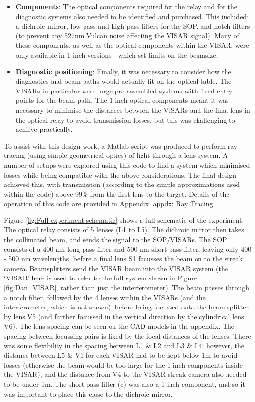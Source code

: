 \begin{itemize}
    \item\textbf{Components}: The optical components required for the relay and for the diagnostic systems also needed to be identified and purchased. This included: a dichroic mirror, low-pass and high-pass filters for the SOP, and notch filters (to prevent any 527nm Vulcan noise affecting the VISAR signal). Many of these components, as well as the optical components within the VISAR, were only available in 1-inch versions - which set limits on the beamsize.
    
    \item \textbf{Diagnostic positioning}: Finally, it was necessary to consider how the diagnostics and beam paths would actually fit on the optical table. The VISARs in particular were large pre-assembled systems with fixed entry points for the beam path. The 1-inch optical components meant it was necessary to minimise the distances between the VISARs and the final lens in the optical relay to avoid transmission losses, but this was challenging to achieve practically.
    
\end{itemize}

To assist with this design work, a Matlab script was produced to perform ray-tracing (using simple geometrical optics) of light through a lens system. A number of setups were explored using this code to find a system which minimised losses while being compatible with the above considerations. The final design achieved this, with transmission (according to the simple approximations used within the code) above 99\% from the first lens to the target. Details of the operation of this code are provided in Appendix \ref{appdx: Ray Tracing}.

Figure \ref{fig:Full experiment schematic} shows a full schematic of the experiment. The optical relay consists of 5 lenses (L1 to L5). The dichroic mirror then takes the collimated beam, and sends the signal to the SOP/VISARs. The SOP consists of a 400 nm long pass filter and 500 nm short pass filter, leaving only 400 - 500 nm wavelengths, before a final lens S1 focusses the beam on to the streak camera. Beamsplitters send the VISAR beam into the VISAR system (the `VISAR' here is used to refer to the full system shown in Figure \ref{fig:Dan_VISAR}, rather than just the interferometer). The beam passes through a notch filter, followed by the 4 lenses within the VISARs (and the interferometer, which is not shown), before being focussed onto the beam splitter by lens V5 (and further focussed in the vertical direction by the cylindrical lens V6). The lens spacing can be seen on the CAD models in the appendix. The spacing between focussing pairs is fixed by the focal distances of the lenses. There was some flexibility in the spacing between L1 \& L2 and L3 \& L4; however, the distance between L5 \& V1 for each VISAR had to be kept below 1m to avoid losses (otherwise the beam would be too large for the 1 inch components inside the VISAR), and the distance from V4 to the VISAR streak camera also needed to be under 1m. The short pass filter (c) was also a 1 inch component, and so it was important to place this close to the dichroic mirror.


